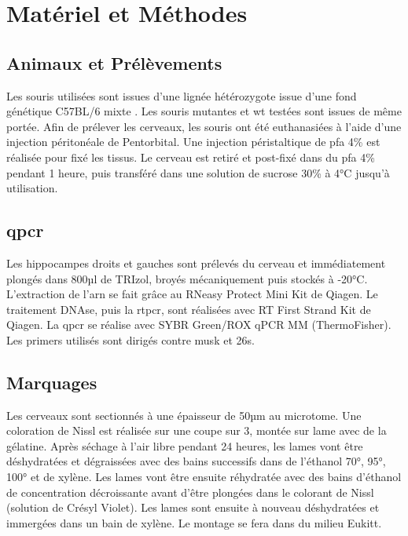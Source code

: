 \chapter{Matériel et Méthodes}

\section{Animaux et Prélèvements}
\label{sec:AnimEtPrelev}
	Les souris utilisées sont issues d'une lignée hétérozygote issue d'une fond génétique C57BL/6 mixte \cite{Messeant2015, Messeant2017}. Les souris mutantes \mcrd et \gls{wt} testées sont issues de même portée. 
	Afin de prélever les cerveaux, les souris ont été euthanasiées à l'aide d'une injection péritonéale de Pentorbital. Une injection péristaltique de \gls{pfa} 4\% est réalisée pour fixé les tissus. Le cerveau est retiré et post-fixé dans du \gls{pfa} 4\% pendant 1 heure, puis transféré dans une solution de sucrose 30\% à 4°C jusqu'à utilisation.
	
\section{\acrshort{qpcr}}
\label{sec:qPCR}
	Les hippocampes droits et gauches sont prélevés du cerveau et immédiatement plongés dans 800µl de TRIzol\textregistered, broyés mécaniquement puis stockés à -20°C. L'extraction de l'\gls{arn} se fait grâce au RNeasy Protect Mini Kit de Qiagen\textregistered. Le traitement DNAse, puis la \gls{rtpcr}, sont réalisées avec RT First Strand Kit de Qiagen\textregistered. La \gls{qpcr} se réalise avec SYBR Green/ROX qPCR MM (ThermoFisher\textregistered). Les primers utilisés sont dirigés contre \gls{musk} et \acrshort{26s}.
	
\section{Marquages}
\label{sec:Marquages}
	Les cerveaux sont sectionnés à une épaisseur de 50µm au microtome. Une coloration de Nissl est réalisée sur une coupe sur 3, montée sur lame avec de la gélatine. Après séchage à l'air libre pendant 24 heures, les lames vont être déshydratées et dégraissées avec des bains successifs dans de l'éthanol 70°, 95°, 100° et de xylène. Les lames vont être ensuite réhydratée avec des bains d'éthanol de concentration décroissante avant d'être plongées dans le colorant de Nissl (solution de Crésyl Violet).  Les lames sont ensuite  à nouveau déshydratées et immergées dans un bain de xylène. Le montage se fera dans du milieu Eukitt\textregistered.
	
